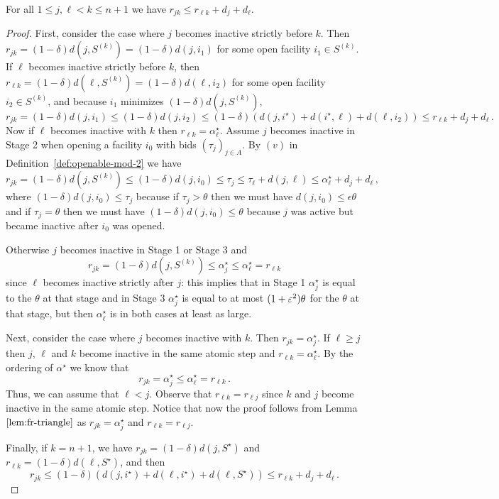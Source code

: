 \begin{lemma}
\label{lem:fr-r-metric}
    For all $1 \le j,\ell < k \le n + 1$ we have $r_{jk} \le r_{\ell k} + d_j + d_\ell$.
\end{lemma}
\begin{proof}
    First, consider the case where $j$ becomes inactive strictly before $k$. Then $r_{jk} = (1-\delta)d(j,S^{(k)}) = (1-\delta)d(j,i_1)$ for some open facility $i_1 \in S^{(k)}$.
    If $\ell$ becomes inactive strictly before $k$, then $r_{\ell k} = (1-\delta)d(\ell,S^{(k)}) = (1-\delta)d(\ell,i_2)$ for some open facility $i_2 \in S^{(k)}$, and because $i_1$ minimizes $(1-\delta)d(j,S^{(k)})$, 
    \[
        r_{jk} = (1-\delta)d(j,i_1) \le (1-\delta)d(j,i_2) \le (1-\delta)(d(j,i^\star) + d(i^\star,\ell) + d(\ell,i_2)) \le r_{\ell k} + d_j + d_\ell\,.
    \]
    Now if $\ell$ becomes inactive with $k$ then $r_{\ell k} = \alpha^\star_\ell$. 
    Assume $j$ becomes inactive in Stage 2 when opening a facility $i_0$ with bids $(\tau_j)_{j \in A}$. By $(v)$ in Definition~\ref{def:openable-mod-2} we have
    \[
        r_{jk} = (1-\delta)d(j,S^{(k)}) \le (1-\delta)d(j,i_0) \le \tau_j \le \tau_\ell + d(j,\ell) \le \alpha^\star_\ell + d_j + d_\ell\,,
    \]
    where $(1-\delta) d(j, i_0) \leq \tau_j$ because if $\tau_j > \theta$ then we must have $d(j, i_0) \leq \epsilon \theta$ and if $\tau_j = \theta$ then we must have $(1-\delta) d(j, i_0) \leq \theta$ because $j$ was active but became inactive after $i_0$ was opened.
    
    Otherwise $j$ becomes inactive in Stage 1 or Stage 3 and
    \[
        r_{jk} = (1-\delta)d(j,S^{(k)}) \le \alpha^\star_j \le \alpha^\star_\ell = r_{\ell k}
    \]
    since $\ell$ becomes inactive strictly after $j$: this implies that in Stage 1 $\alpha^\star_j$ is equal to the $\theta$ at that stage and in Stage 3 $\alpha^\star_j$ is equal to at most $(1+\varepsilon^2)\theta$ for the $\theta$ at that stage, but then $\alpha^\star_\ell$ is in both cases at least as large.
    
    Next, consider the case where $j$ becomes inactive with $k$. Then $r_{jk} = \alpha^\star_j$. If $\ell \ge j$ then $j$, $\ell$ and $k$ become inactive in the same atomic step and $r_{\ell k} = \alpha^\star_\ell$. By the ordering of $\alpha^\star$ we know that 
    \[
        r_{jk} = \alpha^\star_j \le \alpha^\star_\ell = r_{\ell k}\,.
    \]
    Thus, we can assume that $\ell < j$. Observe that $r_{\ell k} = r_{\ell j}$ since $k$ and $j$ become inactive in the same atomic step. Notice that now the proof follows from Lemma $\ref{lem:fr-triangle}$ as $r_{jk} = \alpha^\star_{j}$ and $r_{\ell k} = r_{\ell j}$.

    Finally, if $k = n + 1$, we have $r_{jk} = (1-\delta)d(j, S^\star)$ and $r_{\ell k} = (1-\delta) d(\ell, S^\star)$, and then 
    \[r_{jk} \leq (1-\delta)(d(j, i^\star) + d(\ell, i^\star) + d(\ell, S^\star)) \leq r_{\ell k} + d_j + d_\ell\,.\]
\end{proof}

